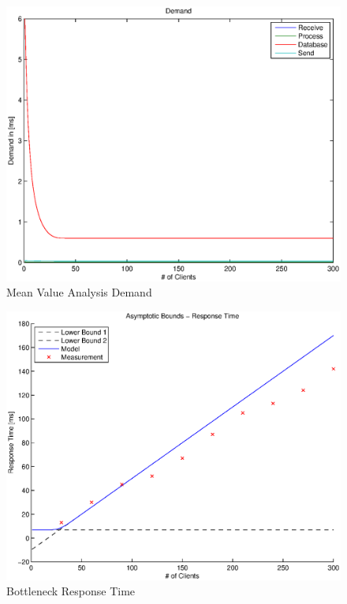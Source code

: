 \documentclass[a4paper]{article}
\begin{document}
\begin{figure}[H]
	\begin{center}
    \includegraphics[scale=0.6]{../plots-ms2-mg/mva-demand.eps}
  \end{center}
  \caption{Mean Value Analysis Demand}
  \label{fig:mva-demand}
\end{figure}




\begin{figure}[H]
	\begin{center}
    \includegraphics[scale=0.6]{../plots-ms2-mg/bottleneck-rt.eps}
  \end{center}
  \caption{Bottleneck Response Time}
  \label{fig:bottleneck-rt}
\end{figure}
\end{document}
